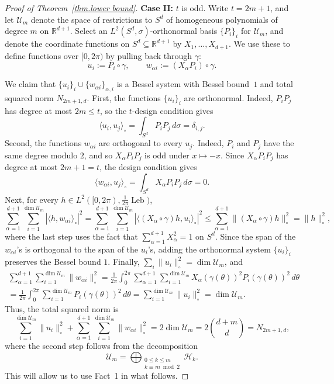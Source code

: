 \documentclass[12pt]{article}
\theoremstyle{plain}
\theoremstyle{definition}
\theoremstyle{remark}
\begin{document}
\begin{proof}[Proof of Theorem~\ref{thm.lower bound}]
\medskip
\noindent
\textbf{Case II:} $t$ is odd.
Write $t=2m+1$, and let $\mathcal{U}_m$ denote the space of restrictions to $S^d$ of homogeneous polynomials of degree $m$ on $\mathbb{R}^{d+1}$.
Select an $L^2(S^d,\sigma)$-orthonormal basis
$\{P_i\}_i$ for $\mathcal{U}_m$, and denote the coordinate functions on
$S^d\subseteq\mathbb R^{d+1}$ by $X_1,\ldots,X_{d+1}$.
We use these to define functions over $[0,2\pi)$ by pulling back through $\gamma$:
\[
u_i:=P_i\circ\gamma,
\qquad
w_{\alpha i}:=(X_\alpha P_i)\circ\gamma.
\]

We claim that $\{u_i\}_{i}
\cup
\{w_{\alpha i}\}_{\alpha,i}$ is a Bessel system with Bessel bound~$1$ and total squared norm
$N_{2m+1,d}$.
First, the functions $\{u_i\}_i$ are orthonormal.
Indeed, $P_iP_j$ has degree at most $2m\leq t$, so the $t$-design condition gives
\[
\langle u_i,u_j\rangle_\circ
=
\int_{S^d}P_iP_j\,d\sigma
=
\delta_{i,j}.
\]
Second, the functions $w_{\alpha i}$ are orthogonal to every $u_j$.
Indeed, $P_i$ and $P_j$ have the same degree modulo $2$, and so $X_\alpha P_iP_j$ is odd
under $x\mapsto -x$.
Since $X_\alpha P_iP_j$ has degree at most $2m+1=t$, the design condition gives
\[
\langle w_{\alpha i},u_j\rangle_\circ
=
\int_{S^d}X_\alpha P_iP_j\,d\sigma
=
0.
\]
Next, for every $h\in L^2([0,2\pi),\frac{1}{2\pi}\operatorname{Leb})$,
\[
\sum_{\alpha=1}^{d+1}\sum_{i=1}^{\operatorname{dim}\mathcal{U}_m}
|\langle h,w_{\alpha i}\rangle_\circ|^2
=
\sum_{\alpha=1}^{d+1}\sum_{i=1}^{\operatorname{dim}\mathcal{U}_m}
|\langle (X_\alpha\circ\gamma)h,u_i\rangle_\circ|^2
\leq
\sum_{\alpha=1}^{d+1}
\|(X_\alpha\circ\gamma)h\|_\circ^2
=
\|h\|_\circ^2,
\]
where the last step uses the fact that $\sum_{\alpha=1}^{d+1}X_\alpha^2=1$ on $S^d$.
Since the span of the $w_{\alpha i}$'s is orthogonal to the span of the
$u_i$'s, adding the orthonormal system $\{u_i\}_i$ preserves the Bessel bound
$1$.
Finally, $\sum_i\|u_i\|_\circ^2=\operatorname{dim}\mathcal{U}_m$,
and
\begin{multline*}
\sum_{\alpha=1}^{d+1}\sum_{i=1}^{\operatorname{dim}\mathcal{U}_m}\|w_{\alpha i}\|_\circ^2
=
\frac{1}{2\pi}\int_0^{2\pi}
\sum_{\alpha=1}^{d+1}\sum_{i=1}^{\operatorname{dim}\mathcal{U}_m}
X_\alpha(\gamma(\theta))^2P_i(\gamma(\theta))^2
\,d\theta\\
=
\frac{1}{2\pi}\int_0^{2\pi}
\sum_{i=1}^{\operatorname{dim}\mathcal{U}_m}P_i(\gamma(\theta))^2\,d\theta
=
\sum_{i=1}^{\operatorname{dim}\mathcal{U}_m}\|u_i\|_\circ^2
=
\operatorname{dim}\mathcal{U}_m.
\end{multline*}
Thus, the total squared norm is 
\[
\sum_{i=1}^{\operatorname{dim}\mathcal{U}_m}\|u_i\|_\circ^2+\sum_{\alpha=1}^{d+1}\sum_{i=1}^{\operatorname{dim}\mathcal{U}_m}\|w_{\alpha i}\|_\circ^2
=
2\operatorname{dim}\mathcal{U}_m
=2\binom{d+m}{d}
=N_{2m+1,d},
\]
where the second step follows from the decomposition
\begin{equation}
\label{eq.decomposition into harmonics}
\mathcal{U}_m
=
\bigoplus_{\substack{0\leq k\leq m\\ k\equiv m\bmod 2}}
\mathcal H_k.
\end{equation}
This will allow us to use Fact~1 in what follows.


\end{proof}
\end{document}
